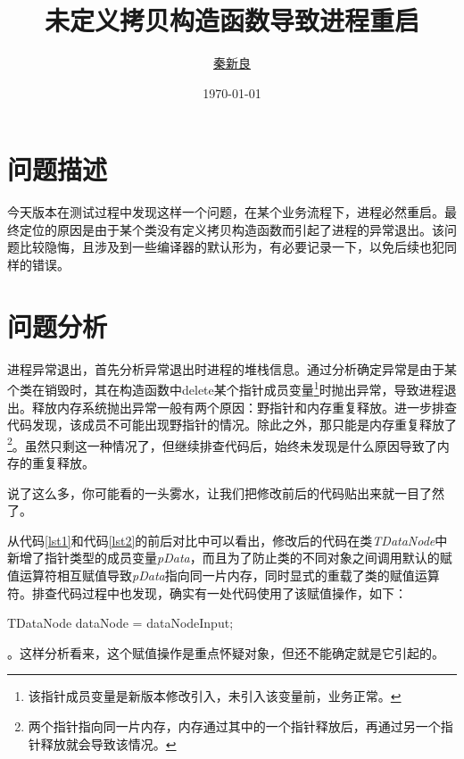 \documentclass[a4paper, 11pt, titlepage]{article}
\newcommand*{\TitleFont}{\usefont{\encodingdefault}{\rmdefault}{b}{n}\fontsize{32}{40}\selectfont}
\begin{document}
\setlength{\parindent}{2em}

\title{\TitleFont 未定义拷贝构造函数导致进程重启}
\author{\href{mailto:foolswonder@gmail.com}{秦新良}}
\date{\today}

\maketitle

\tableofcontents
\newpage

\section{问题描述}
今天版本在测试过程中发现这样一个问题，在某个业务流程下，进程必然重启。最终定位的原因是由于某个类没有定义拷贝构造函数而引起了进程的异常退出。该问题比较隐悔，且涉及到一些编译器的默认形为，有必要记录一下，以免后续也犯同样的错误。

\section{问题分析}
进程异常退出，首先分析异常退出时进程的堆栈信息。通过分析确定异常是由于某个类在销毁时，其在构造函数中delete某个指针成员变量\footnote{该指针成员变量是新版本修改引入，未引入该变量前，业务正常。}时抛出异常，导致进程退出。释放内存系统抛出异常一般有两个原因：野指针和内存重复释放。进一步排查代码发现，该成员不可能出现野指针的情况。除此之外，那只能是内存重复释放了\footnote{两个指针指向同一片内存，内存通过其中的一个指针释放后，再通过另一个指针释放就会导致该情况。}。虽然只剩这一种情况了，但继续排查代码后，始终未发现是什么原因导致了内存的重复释放。

说了这么多，你可能看的一头雾水，让我们把修改前后的代码贴出来就一目了然了。\newline




从代码\ref{lst1}和代码\ref{lst2}的前后对比中可以看出，修改后的代码在类\emph{TDataNode}中新增了指针类型的成员变量\emph{pData}，而且为了防止类的不同对象之间调用默认的赋值运算符相互赋值导致\emph{pData}指向同一片内存，同时显式的重载了类的赋值运算符。排查代码过程中也发现，确实有一处代码使用了该赋值操作，如下：
\begin{snugshade}
{\color{blue}TDataNode} dataNode = dataNodeInput;
\end{snugshade}
。这样分析看来，这个赋值操作是重点怀疑对象，但还不能确定就是它引起的。
\end{document}
